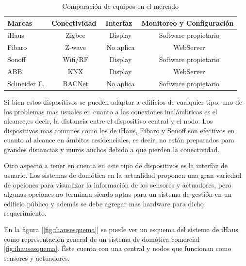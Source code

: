 \begin{table}[h]
	\centering
	\caption[Comparación]{Comparación de equipos en el mercado}
	\begin{tabular}{l c c c}    
		\toprule
		\textbf{Marcas}  	& \textbf{Conectividad}   	&\textbf{Interfaz}  	&\textbf{Monitoreo y Configuración}  						\\
		\midrule
		iHaus				& \ Zigbee 					&\ Display				&\ Software propietario										\\	
		Fibaro				& \ Z-wave					&\ No aplica			&\ WebServer												\\
		Sonoff	 			& \ Wifi/RF 				&\ Display				&\ Software propietario										\\
		ABB		 			& \ KNX 					&\ Display				&\ WebServer												\\
		Schneider E.	 	& \ BACNet 					&\ No aplica			&\ Software propietario										\\
		\bottomrule
		\hline
	\end{tabular}
	\label{tab:sistemasdomotica}
\end{table}

Si bien estos dispositivos se pueden adaptar a edificios de cualquier tipo, uno de los problemas mas usuales en cuanto a las conexiones inalámbricas es el alcance,es decir, la distancia entre el dispositivo central y el nodo. Los dispositivos mas comunes como los de iHaus, Fibaro y Sonoff son efectivos en cuanto al alcance en ámbitos residenciales, es decir, no están preparados para grandes distancias y muros anchos debido a que pierden la conectividad.

Otro aspecto a tener en cuenta en este tipo de dispositivos es la interfaz de usuario. Los sistemas de domótica en la actualidad proponen una gran variedad de opciones para visualizar la información de los sensores y actuadores, pero algunas opciones no terminan siendo aptas para un sistema de gestión en un edificio público y además se debe agregar mas hardware para dicho requerimiento.

En la figura [\ref{fig:ihausesquema}] se puede ver un esquema del sistema de iHaus como representación general de un sistema de domótica comercial \ref{fig:ihausesquema}. Éste cuenta con una central y nodos que funcionan como sensores y actuadores.

